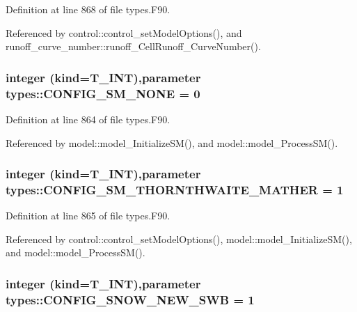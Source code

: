 Definition at line 868 of file types.F90.



Referenced by control::control\_\-setModelOptions(), and runoff\_\-curve\_\-number::runoff\_\-CellRunoff\_\-CurveNumber().

\hypertarget{namespacetypes_a95a5322e516a01cb15894b055211c626}{
\subsubsection[{CONFIG\_\-SM\_\-NONE}]{\setlength{\rightskip}{0pt plus 5cm}integer (kind={\bf T\_\-INT}),parameter {\bf types::CONFIG\_\-SM\_\-NONE} = 0}}
\label{namespacetypes_a95a5322e516a01cb15894b055211c626}


Definition at line 864 of file types.F90.



Referenced by model::model\_\-InitializeSM(), and model::model\_\-ProcessSM().

\hypertarget{namespacetypes_ab0238e5ae5af01cbed3d4744b054f4b7}{
\subsubsection[{CONFIG\_\-SM\_\-THORNTHWAITE\_\-MATHER}]{\setlength{\rightskip}{0pt plus 5cm}integer (kind={\bf T\_\-INT}),parameter {\bf types::CONFIG\_\-SM\_\-THORNTHWAITE\_\-MATHER} = 1}}
\label{namespacetypes_ab0238e5ae5af01cbed3d4744b054f4b7}


Definition at line 865 of file types.F90.



Referenced by control::control\_\-setModelOptions(), model::model\_\-InitializeSM(), and model::model\_\-ProcessSM().

\hypertarget{namespacetypes_a37b9635b00b061613505232f7f0402e9}{
\subsubsection[{CONFIG\_\-SNOW\_\-NEW\_\-SWB}]{\setlength{\rightskip}{0pt plus 5cm}integer (kind={\bf T\_\-INT}),parameter {\bf types::CONFIG\_\-SNOW\_\-NEW\_\-SWB} = 1}}
\label{namespacetypes_a37b9635b00b061613505232f7f0402e9}



